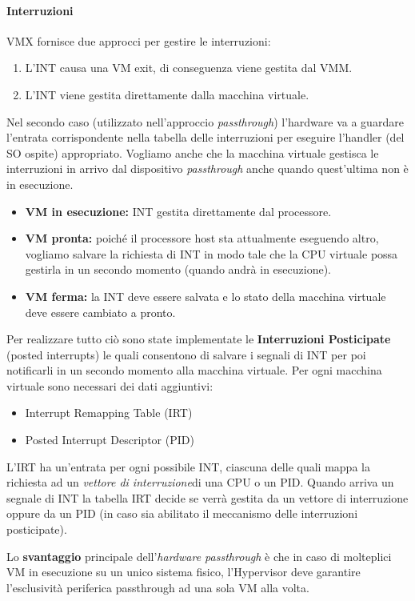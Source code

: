 \documentclass{article}
\begin{document}
\paragraph{Interruzioni}
VMX fornisce due approcci per gestire le interruzioni:
\begin{enumerate}
    \item L’INT causa una VM exit, di conseguenza viene gestita dal VMM.
    \item L’INT viene gestita direttamente dalla macchina virtuale.
\end{enumerate}
Nel secondo caso (utilizzato nell’approccio \textit{passthrough}) l’hardware va a guardare l’entrata corrispondente nella tabella delle interruzioni per eseguire l’handler (del SO ospite) appropriato. Vogliamo anche che la macchina virtuale gestisca le interruzioni in arrivo dal dispositivo \textit{passthrough} anche quando quest’ultima non è in esecuzione.
\begin{itemize}
    \item \textbf{VM in esecuzione:} INT gestita direttamente dal processore.
    \item \textbf{VM pronta:} poiché il processore host sta attualmente eseguendo altro, vogliamo salvare la richiesta di INT in modo tale che la CPU virtuale possa gestirla in un secondo momento (quando andrà in esecuzione).
    \item \textbf{VM ferma:} la INT deve essere salvata e lo stato della macchina virtuale deve essere cambiato a pronto.
\end{itemize}
Per realizzare tutto ciò sono state implementate le \textbf{Interruzioni Posticipate} (posted interrupts) le quali consentono di salvare i segnali di INT per poi notificarli in un secondo momento alla macchina virtuale.
Per ogni macchina virtuale sono necessari dei dati aggiuntivi:
\begin{itemize}
    \item Interrupt Remapping Table (IRT)
    \item Posted Interrupt Descriptor (PID)
\end{itemize}
L’IRT ha un’entrata per ogni possibile INT, ciascuna delle quali mappa la richiesta ad un \textit{vettore di interruzione}\footnotemark  di una CPU o un PID. Quando arriva un segnale di INT la tabella IRT decide se verrà gestita da un vettore di interruzione oppure da un PID (in caso sia abilitato il meccanismo delle interruzioni posticipate).

Lo \textbf{svantaggio} principale dell'\textit{hardware passthrough} è che in caso di molteplici VM in esecuzione su un unico sistema fisico, l'Hypervisor deve garantire l'esclusività periferica passthrough ad una sola VM alla volta.
\end{document}
